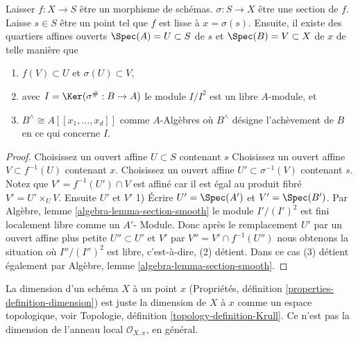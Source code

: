 \begin{lemma}

\label{lemma-section-smooth-morphism}

Laisser $f : X \to S$ être un morphisme de schémas. $\sigma : S \to X$ être une section de $f$. Laisse $s \in S$ être un point tel que $f$ est lisse à $x = \sigma(s)$. Ensuite, il existe des quartiers affines ouverts
$\Spec(A) = U \subset S$ de $s$ et $\Spec(B) = V \subset X$
de $x$ de telle manière que

\begin{enumerate}

\item  $f(V) \subset U$ et $\sigma(U) \subset V$,
\item avec $I = \Ker(\sigma^\# : B \to A)$ le module $I/I^2$
est un libre $A$-module, et
\item  $B^\wedge \cong A[[x_1, \ldots, x_d]]$ comme $A$-Algèbres où
$B^\wedge$ désigne l'achèvement de $B$ en ce qui concerne $I$.

\end{enumerate}

\end{lemma}

\begin{proof}

Choisissez un ouvert affine $U \subset S$ contenant $s$
Choisissez un ouvert affine $V \subset f^{-1}(U)$ contenant $x$. Choisissez un ouvert affine $U' \subset \sigma^{-1}(V)$ contenant $s$. Notez que $V' = f^{-1}(U') \cap V$ est affiné car il est égal au produit fibré $V' = U' \times_U V$. Ensuite $U'$ et $V'$ 1) Écrire $U' = \Spec(A')$ et $V' = \Spec(B')$. Par Algèbre, lemme \ref{algebra-lemma-section-smooth}
le module $I'/(I')^2$ est fini localement libre comme un $A'$- Module. Donc après le remplacement $U'$ par un ouvert affine plus petite $U'' \subset U'$
et $V'$ par $V'' = V' \cap f^{-1}(U'')$ nous obtenons la situation où
$I''/(I'')^2$ est libre, c'est-à-dire, (2) détient. Dans ce cas (3) détient également par Algèbre, lemme \ref{algebra-lemma-section-smooth}.

\end{proof}

\noindent
La dimension d'un schéma $X$ à un point $x$ (Propriétés, définition \ref{properties-definition-dimension}) est juste la dimension de $X$ à $x$ comme un espace topologique, voir Topologie, définition \ref{topology-definition-Krull}. Ce n'est pas la dimension de l'anneau local $\mathcal{O}_{X,x}$, en général.

